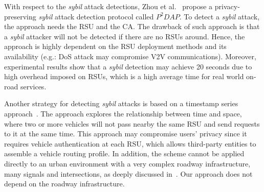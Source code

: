 \documentclass[preprint,12pt]{elsarticle}
\begin{document}
With respect to the \textit{sybil} attack detections, Zhou et al.~\cite{p2dap2, p2dap} propose a privacy-preserving \textit{sybil} attack detection protocol called $P^{2}DAP$. To detect a \textit{sybil} attack, the approach needs the RSU and the CA. The drawback of such approach is that a \textit{sybil} attacker will not be detected if there are no RSUs around. Hence, the approach is highly dependent on the RSU deployment methods and its availability (e.g.: DoS attack may compromise V2V communications). Moreover, experimental results show that a \textit{sybil} detection may achieve 20 seconds due to high overhead imposed on RSUs, which is a high average time for real world on-road services.




Another strategy for detecting \textit{sybil} attacks is based on a timestamp series approach~\cite{sybil-time-space1, sybil-time-stamp1}. The approach explores the relationship between time and space, where two or more vehicles will not pass nearby the same RSU and send requests to it at the same time. This approach may compromise users' privacy since it requires vehicle authentication at each RSU, which allows third-party entities to assemble a vehicle routing profile. In addition, the scheme cannot be applied directly to an urban environment with a very complex roadway infrastructure, many signals and intersections, as deeply discussed in~\cite{sybil-time-stamp1}. Our approach does not depend on the roadway infrastructure.
\end{document}

